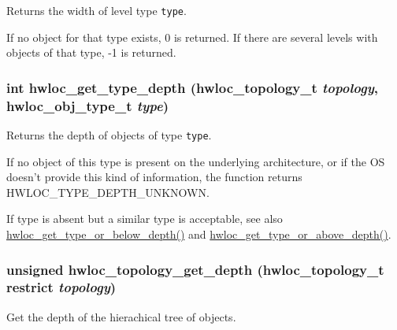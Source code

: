 Returns the width of level type {\tt type}. 

If no object for that type exists, 0 is returned. If there are several levels with objects of that type, -1 is returned. \hypertarget{group__hwlocality__information_g8bec782e21be313750da70cf7428b374}{
\subsubsection[{hwloc\_\-get\_\-type\_\-depth}]{\setlength{\rightskip}{0pt plus 5cm}int hwloc\_\-get\_\-type\_\-depth ({\bf hwloc\_\-topology\_\-t} {\em topology}, \/  {\bf hwloc\_\-obj\_\-type\_\-t} {\em type})}}
\label{group__hwlocality__information_g8bec782e21be313750da70cf7428b374}


Returns the depth of objects of type {\tt type}. 

If no object of this type is present on the underlying architecture, or if the OS doesn't provide this kind of information, the function returns HWLOC\_\-TYPE\_\-DEPTH\_\-UNKNOWN.

If type is absent but a similar type is acceptable, see also \hyperlink{group__hwlocality__helper__types_ga0835c86ef2ce8c62637d61a1cf134f9}{hwloc\_\-get\_\-type\_\-or\_\-below\_\-depth()} and \hyperlink{group__hwlocality__helper__types_g65a1d8f1012cb500817893ef848bc3f1}{hwloc\_\-get\_\-type\_\-or\_\-above\_\-depth()}. \hypertarget{group__hwlocality__information_g3cc2255e237b751a6c8efa8703b3daf5}{
\subsubsection[{hwloc\_\-topology\_\-get\_\-depth}]{\setlength{\rightskip}{0pt plus 5cm}unsigned hwloc\_\-topology\_\-get\_\-depth ({\bf hwloc\_\-topology\_\-t} restrict {\em topology})}}
\label{group__hwlocality__information_g3cc2255e237b751a6c8efa8703b3daf5}


Get the depth of the hierachical tree of objects. 

